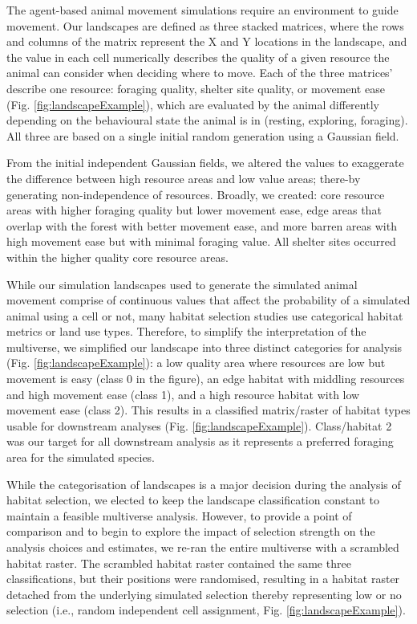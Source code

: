 \documentclass[10pt,a4paper]{article}
\begin{document}
The agent-based animal movement simulations require an environment to guide movement.
Our landscapes are defined as three stacked matrices, where the rows and columns of the matrix represent the X and Y locations in the landscape, and the value in each cell numerically describes the quality of a given resource the animal can consider when deciding where to move.
Each of the three matrices' describe one resource: foraging quality, shelter site quality, or movement ease (Fig. \ref{fig:landscapeExample}), which are evaluated by the animal differently depending on the behavioural state the animal is in (resting, exploring, foraging).
All three are based on a single initial random generation using a Gaussian field.

From the initial independent Gaussian fields, we altered the values to exaggerate the difference between high resource areas and low value areas; there-by generating non-independence of resources.
Broadly, we created: core resource areas with higher foraging quality but lower movement ease, edge areas that overlap with the forest with better movement ease, and more barren areas with high movement ease but with minimal foraging value.
All shelter sites occurred within the higher quality core resource areas.

While our simulation landscapes used to generate the simulated animal movement comprise of continuous values that affect the probability of a simulated animal using a cell or not, many habitat selection studies use categorical habitat metrics or land use types.
Therefore, to simplify the interpretation of the multiverse, we simplified our landscape into three distinct categories for analysis (Fig. \ref{fig:landscapeExample}): a low quality area where resources are low but movement is easy (class 0 in the figure), an edge habitat with middling resources and high movement ease (class 1), and a high resource habitat with low movement ease (class 2).
This results in a classified matrix/raster of habitat types usable for downstream analyses (Fig. \ref{fig:landscapeExample}).
Class/habitat 2 was our target for all downstream analysis as it represents a preferred foraging area for the simulated species.

While the categorisation of landscapes is a major decision during the analysis of habitat selection, we elected to keep the landscape classification constant to maintain a feasible multiverse analysis.
However, to provide a point of comparison and to begin to explore the impact of selection strength on the analysis choices and estimates, we re-ran the entire multiverse with a scrambled habitat raster.
The scrambled habitat raster contained the same three classifications, but their positions were randomised, resulting in a habitat raster detached from the underlying simulated selection thereby representing low or no selection (i.e., random independent cell assignment, Fig. \ref{fig:landscapeExample}).
\end{document}
